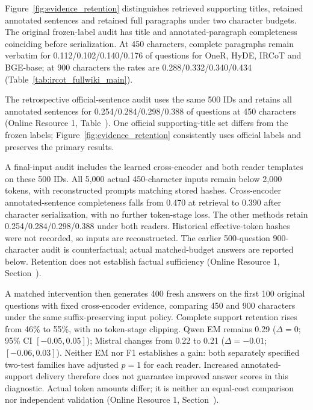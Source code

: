 Figure~\ref{fig:evidence_retention} distinguishes retrieved supporting titles, retained annotated sentences and retained full paragraphs under two character budgets. The original frozen-label audit has title and annotated-paragraph completeness coinciding before serialization. At 450 characters, complete paragraphs remain verbatim for 0.112/0.102/0.140/0.176 of questions for OneR, HyDE, IRCoT and BGE-base; at 900 characters the rates are 0.288/0.332/0.340/0.434 (Table~\ref{tab:ircot_fullwiki_main}).

The retrospective official-sentence audit uses the same 500 IDs and retains all annotated sentences for 0.254/0.284/0.298/0.388 of questions at 450 characters (Online Resource 1, Table~). One official supporting-title set differs from the frozen labels; Figure~\ref{fig:evidence_retention} consistently uses official labels and preserves the primary results.

A final-input audit includes the learned cross-encoder and both reader templates on these 500 IDs. All 5,000 actual 450-character inputs remain below 2,000 tokens, with reconstructed prompts matching stored hashes. Cross-encoder annotated-sentence completeness falls from 0.470 at retrieval to 0.390 after character serialization, with no further token-stage loss. The other methods retain 0.254/0.284/0.298/0.388 under both readers. Historical effective-token hashes were not recorded, so inputs are reconstructed. The earlier 500-question 900-character audit is counterfactual; actual matched-budget answers are reported below. Retention does not establish factual sufficiency (Online Resource 1, Section~).



A matched intervention then generates 400 fresh answers on the first 100 original questions with fixed cross-encoder evidence, comparing 450 and 900 characters under the same suffix-preserving input policy. Complete support retention rises from 46\% to 55\%, with no token-stage clipping. Qwen EM remains 0.29 ($\Delta=0$; 95\% CI $[-0.05,0.05]$); Mistral changes from 0.22 to 0.21 ($\Delta=-0.01$; $[-0.06,0.03]$). Neither EM nor F1 establishes a gain: both separately specified two-test families have adjusted $p=1$ for each reader. Increased annotated-support delivery therefore does not guarantee improved answer scores in this diagnostic. Actual token amounts differ; it is neither an equal-cost comparison nor independent validation (Online Resource 1, Section~).

